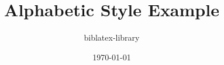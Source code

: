 \documentclass[12pt, a4paper]{article}
\title{Alphabetic Style Example}
\author{biblatex-library}
\date{\today}
\begin{document}
\nocite{*}
\printbibliography
\end{document}
